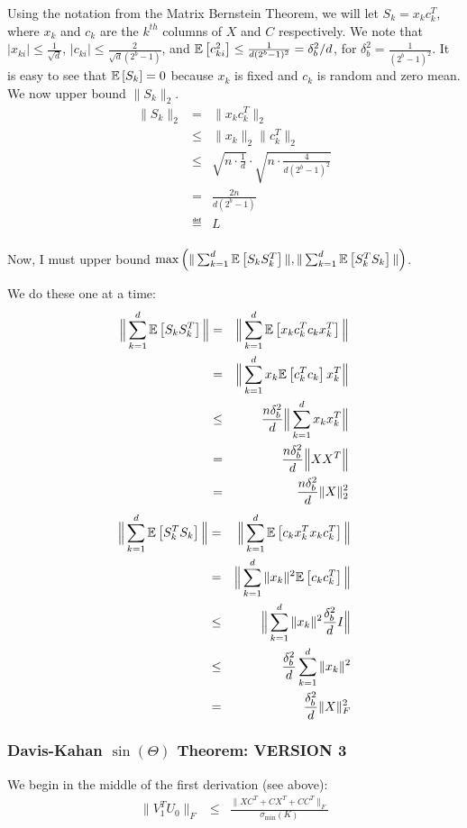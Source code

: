 Using the notation from the Matrix Bernstein Theorem, we will let $S_k = x_k c_k^T$, where $x_k$ and $c_k$ are the $k^{th}$ columns of $X$ and $C$ respectively.
We note that $|x_{ki}| \leq \frac{1}{\sqrt{d}}$, $|c_{ki}| \leq \frac{2}{\sqrt{d}(2^b-1)}$, and $\expect{}{c_{ki}^2} \leq \frac{1}{d(2^b-1)^2} = \delta_b^2/d$, for $\delta_b^2 = \frac{1}{(2^b-1)^2}$.
It is easy to see that $\expect{}{S_k} = 0$ because $x_k$ is fixed and $c_k$ is random and zero mean.
We now upper bound $\|S_k\|_2$.
\begin{eqnarray*}
\|S_k\|_2 &=& \|x_k c_k^T\|_2 \\
&\leq&  \|x_k\|_2 \|c_k^T\|_2 \\
&\leq& \sqrt{n \cdot \frac{1}{d}} \cdot \sqrt{n \cdot \frac{4}{d(2^b-1)^2}}\\
&=& \frac{2n}{d(2^b-1)}\\
&\eqdef& L\\
\end{eqnarray*}

Now, I must upper bound $\max\Big(\|\sum_{k=1}^d \expect{}{S_k S_k^T}\|, \|\sum_{k=1}^d \expect{}{S_k^T S_k}\|\Big)$.

We do these one at a time:
\begin{eqnarray*}
\Big\|\sum_{k=1}^d \expect{}{S_k S_k^T}\Big\| &=& \Big\|\sum_{k=1}^d \expect{}{x_k c_k^T c_k x_k^T }\Big\|\\
&=& \Big\|\sum_{k=1}^d x_k \expect{}{c_k^T c_k} x_k^T \Big\| \\
&\leq& \frac{n\delta_b^2}{d}\Big\|\sum_{k=1}^d x_k x_k^T \Big\| \\
&=&\frac{n\delta_b^2}{d}\Big\|XX^T \Big\| \\
&=&\frac{n\delta_b^2}{d}\|X\|_2^2 \\
\end{eqnarray*}
\begin{eqnarray*}
	\Big\|\sum_{k=1}^d \expect{}{S_k^T S_k}\Big\| &=& \Big\|\sum_{k=1}^d \expect{}{c_k x_k^T x_k c_k^T}\Big\|\\
	&=& \Big\|\sum_{k=1}^d \|x_k\|^2 \expect{}{c_k c_k^T}\Big\| \\
	&\leq& \Big\|\sum_{k=1}^d \|x_k\|^2 \frac{\delta_b^2}{d}I\Big\| \\
	&\leq& \frac{\delta_b^2}{d} \sum_{k=1}^d \|x_k\|^2 \\
	&=& \frac{\delta_b^2}{d} \|X\|_F^2 \\
\end{eqnarray*}


\subsubsection{Davis-Kahan $\sin(\Theta)$ Theorem: VERSION 3}
We begin in the middle of the first derivation (see above):
\begin{eqnarray*}
	\|V_1^T U_0\|_F	&\leq& \frac{ \|XC^T + CX^T + CC^T\|_F}{\sigma_{\min}(K)} \\
\end{eqnarray*}

